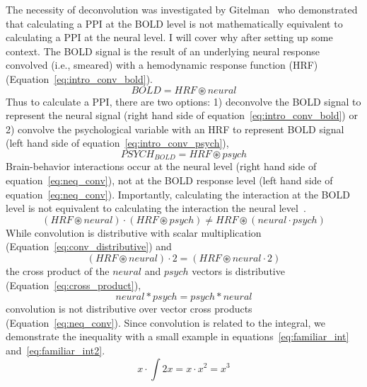 \documentclass[phd,figures,tables,ackpage,abstractpage,publicabstractpage]{uithesis}
\begin{document}
The necessity of deconvolution was investigated by Gitelman~\cite{Gitelman2003} who demonstrated
that calculating a PPI at the BOLD level is not mathematically equivalent to calculating
a PPI at the neural level.
I will cover why after setting up some context.
The BOLD signal is the result of an underlying neural response convolved (i.e., smeared)
with a hemodynamic response function (HRF)(Equation~\ref{eq:intro_conv_bold}).
\begin{equation}
  BOLD = HRF \circledast neural
  \label{eq:intro_conv_bold}
\end{equation}
Thus to calculate a PPI, there are two options:
1) deconvolve the BOLD signal to represent the neural signal
(right hand side of equation~\ref{eq:intro_conv_bold}) or
2) convolve the psychological variable with an HRF to represent BOLD signal
(left hand side of equation~\ref{eq:intro_conv_psych}),
\begin{equation}
  PSYCH_{BOLD} = HRF \circledast psych
  \label{eq:intro_conv_psych}
\end{equation}
Brain-behavior interactions occur at the neural level
(right hand side of equation~\ref{eq:neq_conv}), not at the
BOLD response level (left hand side of equation~\ref{eq:neq_conv}).
Importantly, calculating the interaction at the BOLD level is not
equivalent to calculating the interaction the neural level~\cite{Gitelman2003}.
\begin{equation}
  (HRF \circledast neural) \cdot (HRF \circledast psych) \neq HRF \circledast (neural \cdot psych)
  \label{eq:neq_conv}
\end{equation}
While convolution is distributive with scalar multiplication (Equation~\ref{eq:conv_distributive}) and
\begin{equation}
  (HRF \circledast neural) \cdot 2 = (HRF \circledast neural \cdot 2) 
  \label{eq:conv_distributive}
\end{equation}
the cross product of the $neural$ and $psych$ vectors is distributive (Equation~\ref{eq:cross_product}),
\begin{equation}
  neural * psych = psych * neural
  \label{eq:cross_product}
\end{equation}
convolution is not distributive over vector cross products (Equation~\ref{eq:neq_conv}).
Since convolution is related to the integral,
we demonstrate the inequality with a small example in
equations~\ref{eq:familiar_int} and~\ref{eq:familiar_int2}.
\begin{equation}
  x \cdot \int 2x = x \cdot x^2 = x^3
  \label{eq:familiar_int}
\end{equation}
\end{document}
